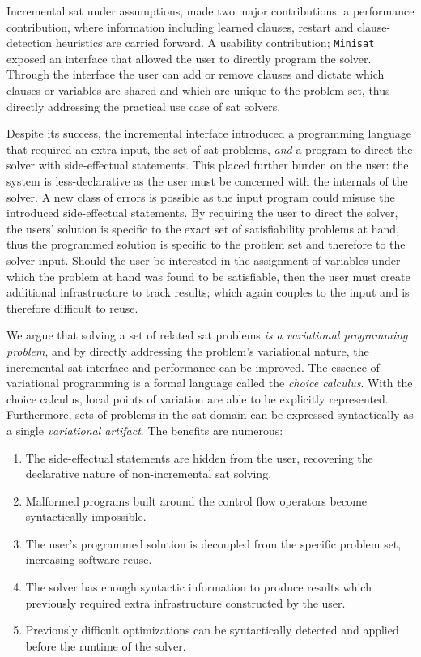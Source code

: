 Incremental \ac{sat} under assumptions, made two major contributions: a
performance contribution, where information including learned clauses, restart
and clause-detection heuristics are carried forward. A usability contribution;
\texttt{Minisat} exposed an interface that allowed the user to directly
program the solver. Through the interface the user can add or remove clauses and
dictate which clauses or variables are shared and which are unique to the
problem set, thus directly addressing the practical use case of \ac{sat}
solvers.

Despite its success, the incremental interface introduced a programming language
that required an extra input, the set of \ac{sat} problems, \emph{and} a program
to direct the solver with side-effectual statements. This placed further burden
on the user: the system is less-declarative as the user must be concerned
with the internals of the solver. A new class of errors is possible as the input
program could misuse the introduced side-effectual statements. By requiring the
user to direct the solver, the users' solution is specific to the exact set of
satisfiability problems at hand, thus the programmed solution is specific to the
problem set and therefore to the solver input. Should the user be interested in
the assignment of variables under which the problem at hand was found to be
satisfiable, then the user must create additional infrastructure to track
results; which again couples to the input and is therefore difficult to reuse.

We argue that solving a set of related \ac{sat} problems \emph{is a variational
  programming problem}, and by directly addressing the problem's variational
nature, the incremental \ac{sat} interface and performance can be improved. The
essence of variational programming is a formal language called the \emph{choice
  calculus}. With the choice calculus, local points of variation are able to be
explicitly represented. Furthermore, sets of problems in the \ac{sat} domain can
be expressed syntactically as a single \emph{variational artifact}. The benefits
are numerous:
\begin{enumerate}
\item The side-effectual statements are hidden from the user, recovering the
  declarative nature of non-incremental \ac{sat} solving.
\item Malformed programs built around the control flow operators become
  syntactically impossible.
\item The user's programmed solution is decoupled from the specific problem
  set, increasing software reuse.
\item The solver has enough syntactic information to produce results which
  previously required extra infrastructure constructed by the user.
\item Previously difficult optimizations can be syntactically detected and
  applied before the runtime of the solver.
\end{enumerate}


